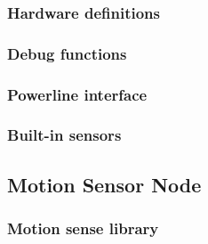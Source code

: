 \subsubsection{Hardware definitions}


\subsubsection{Debug functions}



\subsubsection{Powerline interface}



\subsubsection{Built-in sensors}



\pagebreak


\subsection{Motion Sensor Node}
\label{an:motion-code}

\subsubsection{Motion sense library}



